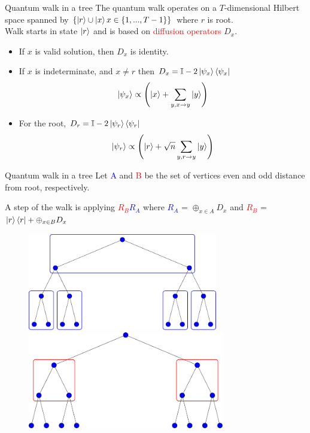 \documentclass{beamer}
\begin{document}
\begin{frame}{Quantum walk in a tree} \pause
The quantum walk operates on a $T$-dimensional Hilbert space spanned by $\{\ket{r} \cup \ket{x} x \in \{1, ..., T-1\}\}$ where $r$ is root. \pause \\
Walk starts in state $\ket{r}$ and is based on \textcolor{red}{diffusion operators} $D_x$. \pause
\begin{itemize}
		\item If $x$ is valid solution, then $D_x$ is identity.
	\pause
		\item If $x$ is indeterminate, and $ x \neq r $ then $D_x = \mathbb{I} - 2\ket{\psi_x}\bra{\psi_x} $ \\
		$$ \ket{\psi_x} \propto\left( \ket{x} + \sum_{y, x \to y} \ket{y} \right) $$
	\pause
		\item For the root, $ D_r = \mathbb{I} - 2\ket{\psi_r}\bra{\psi_r} $
		$$ \ket{\psi_r} \propto\left( \ket{r} + \sqrt{n}\sum_{y, r \to y} \ket{y} \right) $$
\end{itemize}

\end{frame}

\begin{frame}{Quantum walk in a tree}\pause
Let \textcolor{blue}{A} and \textcolor{red}{B} be the set of vertices even and odd distance from root, respectively.\pause

A step of the walk is applying \textcolor{red}{$R_B$}\textcolor{blue}{$R_A$} where \textcolor{blue}{$R_A$} = $\oplus_{x\in A}D_x$ and \textcolor{red}{$R_B$} = $\ket{r}\bra{r} + \oplus_{x\in B}D_x$\pause
\begin{figure}
	\centering
	\begin{overprint}
		\centering
		\includegraphics[height=120pt]{figures/R_A}
		\onslide<5>\centering
		\includegraphics[height=120pt]{figures/R_B}
	\end{overprint}
\end{figure}
\end{frame}
\end{document}
